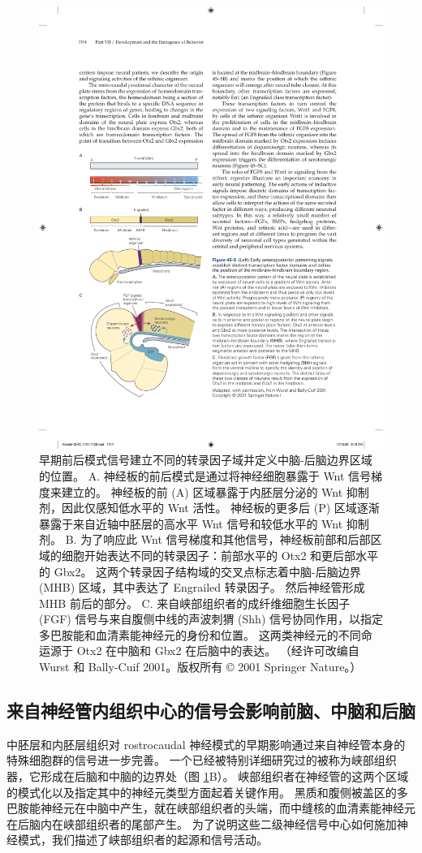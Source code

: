 \begin{figure}[htbp]
	\centering
	\includegraphics[width=0.5\linewidth]{chap45/fig_45_5}
	\caption{早期前后模式信号建立不同的转录因子域并定义中脑-后脑边界区域的位置。 A. 神经板的前后模式是通过将神经细胞暴露于 Wnt 信号梯度来建立的。 神经板的前 (A) 区域暴露于内胚层分泌的 Wnt 抑制剂，因此仅感知低水平的 Wnt 活性。 神经板的更多后 (P) 区域逐渐暴露于来自近轴中胚层的高水平 Wnt 信号和较低水平的 Wnt 抑制剂。 B. 为了响应此 Wnt 信号梯度和其他信号，神经板前部和后部区域的细胞开始表达不同的转录因子：前部水平的 Otx2 和更后部水平的 Gbx2。 这两个转录因子结构域的交叉点标志着中脑-后脑边界 (MHB) 区域，其中表达了 Engrailed 转录因子。 然后神经管形成 MHB 前后的部分。 C. 来自峡部组织者的成纤维细胞生长因子 (FGF) 信号与来自腹侧中线的声波刺猬 (Shh) 信号协同作用，以指定多巴胺能和血清素能神经元的身份和位置。 这两类神经元的不同命运源于 Otx2 在中脑和 Gbx2 在后脑中的表达。 （经许可改编自 Wurst 和 Bally-Cuif 2001。版权所有 © 2001 Springer Nature。）}
	\label{fig:45_5}
\end{figure}

\subsection{来自神经管内组织中心的信号会影响前脑、中脑和后脑}
中胚层和内胚层组织对 rostrocaudal 神经模式的早期影响通过来自神经管本身的特殊细胞群的信号进一步完善。 一个已经被特别详细研究过的被称为峡部组织器，它形成在后脑和中脑的边界处（图 \ref{fig:45_5}B）。 峡部组织者在神经管的这两个区域的模式化以及指定其中的神经元类型方面起着关键作用。 黑质和腹侧被盖区的多巴胺能神经元在中脑中产生，就在峡部组织者的头端，而中缝核的血清素能神经元在后脑内在峡部组织者的尾部产生。 为了说明这些二级神经信号中心如何施加神经模式，我们描述了峡部组织者的起源和信号活动。

